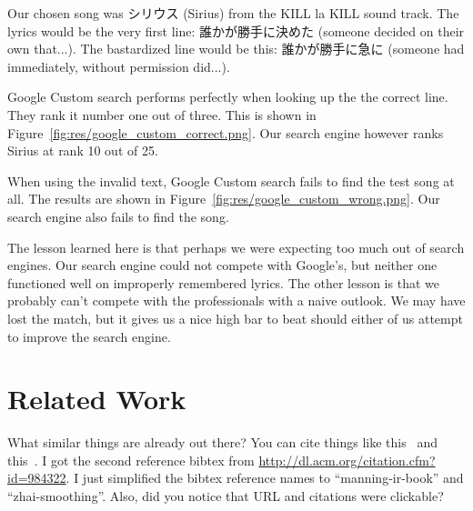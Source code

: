\documentclass{acm} %
\begin{document}
\begin{CJK}{UTF8}{zhsong}
Our chosen song was シリウス (Sirius) from the KILL la KILL sound track. The lyrics would be the very first line: 誰かが勝手に決めた (someone decided on their own that...). The bastardized line would be this: 誰かが勝手に急に (someone had immediately, without permission did...).

Google Custom search performs perfectly when looking up the the correct line. They rank it number one out of three. This is shown in Figure~\ref{fig:res/google_custom_correct.png}. Our search engine however ranks Sirius at rank 10 out of 25.


When using the invalid text, Google Custom search fails to find the test song at all. The results are shown in Figure~\ref{fig:res/google_custom_wrong.png}. Our search engine also fails to find the song.


The lesson learned here is that perhaps we were expecting too much out of search engines. Our search engine could not compete with Google's, but neither one functioned well on improperly remembered lyrics. The other lesson is that we probably can't compete with the professionals with a naive outlook. We may have lost the match, but it gives us a nice high bar to beat should either of us attempt to improve the search engine.



\section{Related Work}

What similar things are already out there? You can cite things like
this~\cite{manning-ir-book} and this~\cite{zhai-smoothing}. I got the second
reference bibtex from \url{http://dl.acm.org/citation.cfm?id=984322}. I just
simplified the bibtex reference names to ``manning-ir-book'' and
``zhai-smoothing''. Also, did you notice that URL and citations were clickable?


\end{CJK}
\end{document}
